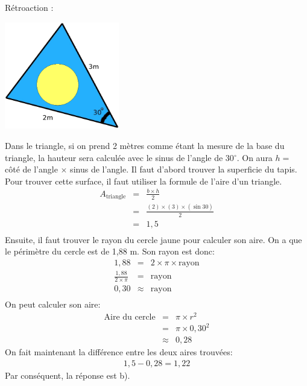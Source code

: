 \documentclass[letterpaper, 12pt]{article}
\begin{document}
R\'etroaction :\\
\begin{center}
 \includegraphics[width=5cm,bb=14 14 528 494]{Q2308.eps}
\end{center}
Dans le triangle, si on prend 2 m\`etres comme \'etant la mesure de la base du triangle, la hauteur sera calcul\'ee avec le sinus de l'angle de 30$^{\circ}$. On aura $h=$ c\^ot\'e de l'angle $\times$ sinus de l'angle.
Il faut d'abord trouver la superficie du tapis. Pour trouver cette surface, il faut utiliser la formule de l'aire d'un triangle.
\begin{eqnarray*}
A_{\textrm{triangle}}&=&\frac{b\times h}{2}\\
&=&\frac{(2)\times(3)\times(\sin{30})}{2}\\
&=&1,5\\
\end{eqnarray*}
Ensuite, il faut trouver le rayon du cercle jaune pour calculer son aire. On a que le p\'erim\`etre du cercle est de 1,88 m. Son rayon est donc:
 \begin{eqnarray*}
1,88&=&2\times\pi\times\textrm{rayon}\\[2mm]
\frac{1,88}{2\times\pi}&=&\textrm{rayon}\\[2mm]
0,30&\approx&\textrm{rayon}\\
\end{eqnarray*}
On peut calculer son aire:
 \begin{eqnarray*}
\textrm{Aire du cercle}&=&\pi \times r^{2}\\
&=& \pi \times0,30^{2}\\
&\approx&0,28
\end{eqnarray*}
On fait maintenant la diff\'erence entre les deux aires trouv\'ees:
 \begin{eqnarray*}
1,5-0,28=1,22
\end{eqnarray*}
Par cons\'equent, la r\'eponse est b).\\
\end{document}
